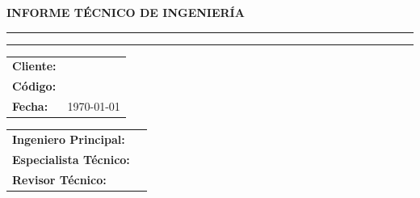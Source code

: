 \begin{titlepage}
	\thispagestyle{corporativo}

	\centering
	\vspace*{2cm}

	{\Large\bfseries INFORME TÉCNICO DE INGENIERÍA}

	\vspace{1cm}
	\rule{\linewidth}{0.4pt}

	\vspace{0.6cm}
	{\huge\bfseries \projecttitle}

	\vspace{0.6cm}
	\rule{\linewidth}{0.4pt}

	\vspace{2cm}

	\begin{table}[h]
		\raggedright
		\begin{tabular}{@{}ll@{}}
			\toprule
			\rowcolor{green!15}
			\textbf{Cliente:} & \targetcompany \\
			\textbf{Código:} & \documentcode \\
			\textbf{Fecha:} & \today \\
			\bottomrule
		\end{tabular}
	\end{table}

	\vspace{2cm}

	\begin{table}[h]
		\raggedright
		\begin{tabular}{@{}ll@{}}
			\toprule
			\rowcolor{green!15}
			\textbf{Ingeniero Principal:} & \firmaAprobo \\
			\textbf{Especialista Técnico:} & \firmaElaboro \\
			\textbf{Revisor Técnico:} & \firmaReviso \\
			\bottomrule
		\end{tabular}
	\end{table}

	\vfill


\end{titlepage}
